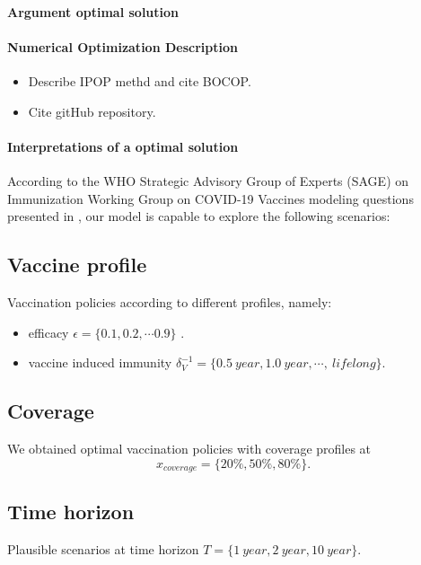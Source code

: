 \paragraph{Argument optimal solution}
\paragraph{Numerical Optimization Description}
    \begin{itemize}
        \item Describe IPOP methd and cite BOCOP.
        \item Cite gitHub repository.
    \end{itemize}
\paragraph{Interpretations of a optimal solution}

    According to the WHO Strategic Advisory Group of Experts (SAGE) on
Immunization Working Group on COVID-19 Vaccines modeling questions
presented in \cite{sage2020}, our model is capable to explore the
following scenarios:
    \subsection*{Vaccine profile}
    Vaccination policies according to different profiles, namely:
    \begin{itemize}
      \item
          efficacy
          $\epsilon = \{\num{0.1}, \num{0.2}, \cdots  \num{0.9} \}$ .
      \item
        vaccine induced immunity
        $
          \delta_V ^{-1}=
            \{\SI{0.5}{year},
              \SI{1.0}{year}, \cdots, \SI{}{lifelong}
            \}.
        $
    \end{itemize}


  \subsection*{Coverage}
    We obtained optimal vaccination policies with coverage profiles at
    $$
      x_{coverage} =
        \{
          20\%, 50\%, 80\%
        \}.
    $$
  \subsection*{Time horizon}
  Plausible scenarios at time horizon
  $
    T= \{ \SI{1}{year}, \SI{2}{year}, \SI{10}{year} \}.
  $

